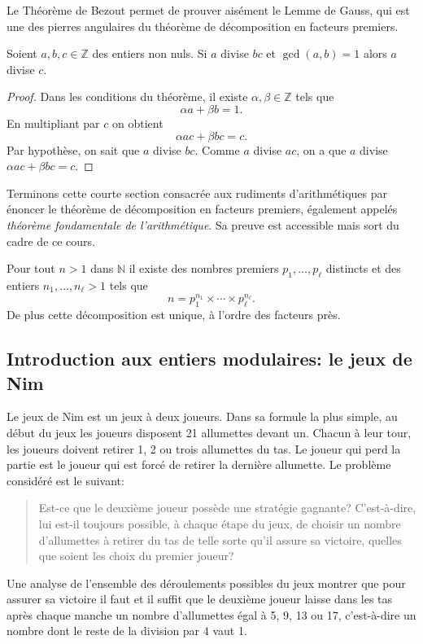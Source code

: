 \documentclass[french,course,oneside,theoremnosection]{lecture}
\newcommand{\N}{\mathbb{N}}
\newcommand{\Z}{\mathbb{Z}}
\begin{document}
Le Théorème de Bezout permet de prouver aisément le Lemme de Gauss, qui est une des pierres angulaires du théorème de décomposition en facteurs premiers.
\begin{lemma} 
Soient $a,b,c \in \Z$ des entiers non nuls. Si $a$ divise $bc$ et $\gcd(a,b)=1$ alors $a$ divise $c$.
\end{lemma}
\begin{proof}Dans les conditions du théorème, il existe $\alpha,\beta \in \Z$ tels que
\[
\alpha a +\beta b = 1.
\]
En multipliant par $c$ on obtient
\[
\alpha ac+\beta bc = c.
\]
Par hypothèse, on sait que $a$ divise $bc$. Comme $a$ divise $ac$, on a que $a$ divise $\alpha ac+ \beta bc = c$.
\end{proof}

Terminons cette courte section consacrée aux rudiments d'arithmétiques par énoncer le théorème de décomposition en facteurs premiers, également appelés \emph{théorème fondamentale de l'arithmétique}. Sa preuve est accessible mais sort du cadre de ce cours.
\begin{theorem}
Pour tout $n>1$ dans $\N$ il existe des nombres premiers $p_1, \ldots, p_\ell$ distincts et des entiers $n_1, \ldots, n_\ell >1$ tels que
\[
n =p_1^{n_1}\times \cdots \times p_\ell^{n_\ell}.
\]
De plus cette décomposition est unique, à l'ordre des facteurs près.
\end{theorem}

\subsection{Introduction aux entiers modulaires: le jeux de Nim}
Le jeux de Nim est un jeux à deux joueurs. Dans sa formule la plus simple, au début du jeux les joueurs disposent 21 allumettes devant un. Chacun à leur tour, les joueurs doivent  retirer 1, 2 ou trois allumettes du tas.  Le joueur qui perd la partie est le joueur qui est forcé de retirer la dernière allumette. Le problème considéré est le suivant:
\begin{quotation}
Est-ce que le deuxième joueur possède une stratégie gagnante? C'est-à-dire, lui est-il toujours possible, à chaque étape du jeux, de choisir un nombre d'allumettes à retirer du tas de telle sorte qu'il assure sa victoire, quelles que soient les choix du premier joueur?
\end{quotation}

Une analyse de l'ensemble des déroulements possibles du jeux montrer que pour assurer sa victoire il faut et il suffit que le deuxième joueur laisse dans les tas après chaque manche un nombre d'allumettes égal à 5, 9, 13 ou 17, c'est-à-dire un nombre dont le reste de la division par 4 vaut 1.
\end{document}
